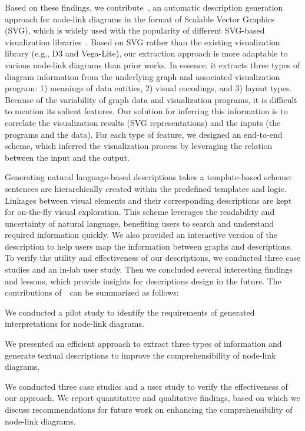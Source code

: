 Based on these findings, we contribute~\ApproachName, an automatic description generation approach for node-link diagrams in the format of Scalable Vector Graphics (SVG), which is widely used with the popularity of different SVG-based visualization libraries~\cite{DBLP:journals/tvcg/BostockOH11, sievert2017plotly, DBLP:journals/vi/WangBLDFPC21}. Based on SVG rather than the existing visualization library (e.g., D3 and Vega-Lite), our extraction approach is more adaptable to various node-link diagrams than prior works. In essence, it extracts three types of diagram information from the underlying graph and associated visualization program: 1) meanings of data entities, 2) visual encodings, and 3) layout types. Because of the variability of graph data and visualization programs, it is difficult to mention its salient features. Our solution for inferring this information is to correlate the visualization results (SVG representations) and the inputs (the programs and the data). For each type of feature, we designed an end-to-end scheme, which inferred the visualization process by leveraging the relation between the input and the output.

Generating natural language-based descriptions takes a template-based scheme: sentences are hierarchically created within the predefined templates and logic. Linkages between visual elements and their corresponding descriptions are kept for on-the-fly visual exploration. This scheme leverages the readability and uncertainty of natural language, benefiting users to search and understand required information quickly. We also provided an interactive version of the description to help users map the information between graphs and descriptions.
To verify the utility and effectiveness of our descriptions, we conducted three case studies and an in-lab user study. Then we concluded several interesting findings and lessons, which provide insights for descriptions design in the future.
The contributions of~\ApproachName~can be summarized as follows:
\begin{compactenum}
\item We conducted a pilot study to identify the requirements of generated interpretations for node-link diagrams.
\item We presented an efficient approach to extract three types of information and generate textual descriptions to improve the comprehensibility of node-link diagrams.
\item We conducted three case studies and a user study to verify the effectiveness of our approach. We report
quantitative and qualitative findings, based on which we discuss recommendations for future work on enhancing the comprehensibility of node-link diagrams.
\end{compactenum}















